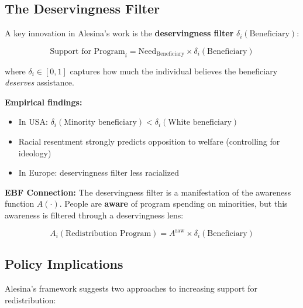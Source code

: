 \subsection{The Deservingness Filter}

A key innovation in Alesina's work is the \textbf{deservingness filter} $\delta_i(\text{Beneficiary})$:

\begin{equation}
\text{Support for Program}_i = \text{Need}_{\text{Beneficiary}} \times \delta_i(\text{Beneficiary})
\end{equation}

where $\delta_i \in [0,1]$ captures how much the individual believes the beneficiary \emph{deserves} assistance.

\textbf{Empirical findings:}
\begin{itemize}
\item In USA: $\delta_i(\text{Minority beneficiary}) < \delta_i(\text{White beneficiary})$
\item Racial resentment strongly predicts opposition to welfare (controlling for ideology)
\item In Europe: deservingness filter less racialized
\end{itemize}

\textbf{EBF Connection:} The deservingness filter is a manifestation of the awareness function $A(\cdot)$. People are \textbf{aware} of program spending on minorities, but this awareness is filtered through a deservingness lens:

\begin{equation}
A_i(\text{Redistribution Program}) = A^{\text{raw}} \times \delta_i(\text{Beneficiary})
\end{equation}

\subsection{Policy Implications}

Alesina's framework suggests two approaches to increasing support for redistribution:

